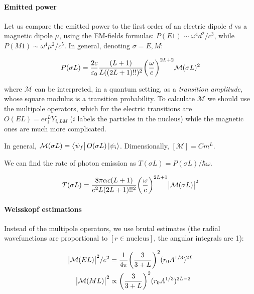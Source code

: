 \documentclass[main.tex]{subfiles}
\begin{document}
\paragraph{Emitted power}

Let us compare the emitted power to the first order of an electric dipole \(d\) vs a magnetic dipole \(\mu\), using the EM-fields formulas: \(P(E1) \sim \omega^4 d^2 / c^3\), while \(P(M1) \sim \omega^4 \mu^2 / c^5\). In general, denoting \(\sigma = E, M\):

\begin{equation}
    P(\sigma L) = \frac{2c}{\varepsilon_0} \frac{(L+1)}{L((2L+1)!!)^2} \qty(\frac{\omega}{c})^{2L+2} \mathcal M (\sigma L)^2
\end{equation}

where \(\mathcal M\) can be interpreted, in a quantum setting, as a \emph{transition amplitude}, whose square modulus is a transition probability.
To calculate \(\mathcal M\) we should use the multipole operators, which for the electric transitions are \(O(EL) = e r^L_i Y_{i,LM}\) (\(i\) labels the particles in the nucleus) while the magnetic ones are much more complicated.

In general, \(\mathcal M (\sigma L) = \bra{\psi_f} O(\sigma L) \ket{\psi_i} \).
Dimensionally, \([\mathcal M] = C m^L\).

We can find the rate of photon emission as \(T(\sigma L) = P(\sigma L) / \hbar \omega\).

\begin{equation}
    T(\sigma L ) =
    \frac{8 \pi \alpha c (L+1)}{e^2 L (2L+1)!!^2} \qty(\frac{\omega }{c})^{2L+1}
    \abs{\mathcal M (\sigma L)}^2
\end{equation}

\paragraph{Weisskopf estimations}

Instead of the multipole operators, we use brutal estimates (the radial wavefunctions are proportional to \([r \in \text{nucleus}]\), the angular integrals are 1):

\begin{subequations}
\begin{align}
    \abs{\mathcal M (EL)}^2/e^2 &= \frac{1}{4 \pi} \qty(\frac{3}{3+L}) ^2 (r_0 A^{1/3})^{2L} \\
    \abs{\mathcal M (ML)}^2 &\propto \qty(\frac{3}{3+L}) ^2 (r_0 A^{1/3})^{2L-2}
\end{align}
\end{subequations}
\end{document}
